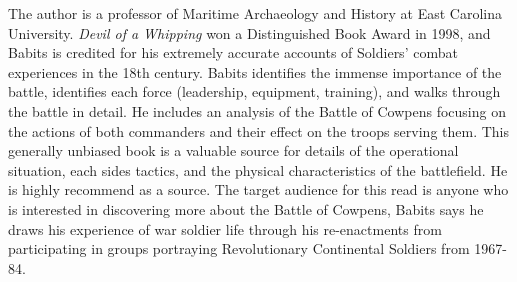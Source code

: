 The author is a professor of Maritime Archaeology and History at East
Carolina University.  \emph{Devil of a Whipping} won a Distinguished Book Award
in 1998, and Babits is credited for his extremely accurate accounts of
Soldiers' combat experiences in the 18th century.
%
Babits identifies the immense importance of the battle, identifies each force
(leadership, equipment, training), and walks through the battle in detail.
He includes an analysis of the Battle of Cowpens focusing on the actions of both
commanders and their effect on the troops serving them.
%
This generally unbiased book is a valuable source for details of the operational
situation, each sides tactics, and the physical characteristics of the
battlefield. He is highly recommend as a source.
The target audience for this read is anyone who is interested in discovering
more about the Battle of Cowpens,
%
Babits says he draws his experience of war
soldier life through his re-enactments from participating in groups portraying
Revolutionary Continental Soldiers from 1967-84.






